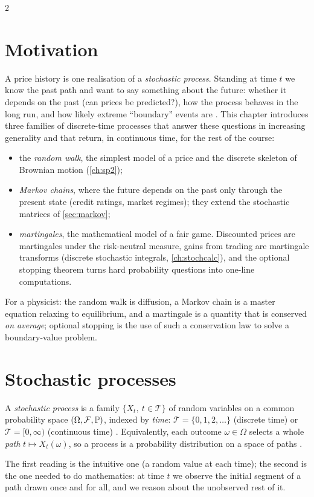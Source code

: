 \begin{paracol}{2}
\section*{Motivation}
A price history is one realisation of a \emph{stochastic process}. Standing at time $t$ we know the
past path and want to say something about the future: whether it depends on the past (can prices be
predicted?), how the process behaves in the long run, and how likely extreme ``boundary'' events are
. This chapter introduces three families of discrete-time processes that answer these
questions in increasing generality and that return, in continuous time, for the rest of the course:
\begin{itemize}
  \item the \emph{random walk}, the simplest model of a price and the discrete skeleton of Brownian
        motion (\cref{ch:sp2});
  \item \emph{Markov chains}, where the future depends on the past only through the present state
        (credit ratings, market regimes); they extend the stochastic matrices of \cref{sec:markov};
  \item \emph{martingales}, the mathematical model of a fair game. Discounted prices are martingales
        under the risk-neutral measure, gains from trading are martingale transforms (discrete
        stochastic integrals, \cref{ch:stochcalc}), and the optional stopping theorem turns
        hard probability questions into one-line computations.
\end{itemize}
For a physicist: the random walk is diffusion, a Markov chain is a master equation relaxing to
equilibrium, and a martingale is a quantity that is conserved \emph{on average}; optional stopping is the
use of such a conservation law to solve a boundary-value problem.

\section{Stochastic processes}\label{ch04:sec-processes}

\begin{definition}
A \emph{stochastic process} is a family $\{X_t,\ t\in\mathcal T\}$ of random variables on a common
probability space $(\Omega,\mathcal F,\mathbb{P})$, indexed by \emph{time}: $\mathcal T=\{0,1,2,\dots\}$
(discrete time) or $\mathcal T=[0,\infty)$ (continuous time) . Equivalently, each outcome
$\omega\in\Omega$ selects a whole \emph{path} $t\mapsto X_t(\omega)$, so a process is a probability
distribution on a space of paths .
\end{definition}
The first reading is the intuitive one (a random value at each time); the second is the one needed to do
mathematics: at time $t$ we observe the initial segment of a path drawn once and for all, and we reason
about the unobserved rest of it.


\end{paracol}
